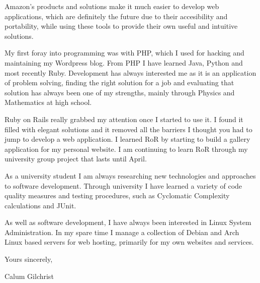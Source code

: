 


\setlength{\parskip}{0.5em}






Amazon's products and solutions make it much easier to develop web applications,
which are definitely the future due to their accesibility and portability, while
using these tools to provide their own useful and intuitive solutions. 


My first foray into programming was with PHP, which I used for hacking and
maintaining my Wordpress blog. From PHP I have learned Java, Python and most
recently Ruby. Development has always interested me as it is an application of
problem solving, finding the right solution for a job and evaluating that
solution has always been one of my strengths, mainly through Physics and
Mathematics at high school.

Ruby on Rails really grabbed my attention once I started to use it. I found it
filled with elegant solutions and it removed all the barriers I thought you had to
jump to develop a web application. I learned RoR by starting to build a gallery
application for my personal website. I am continuing to learn RoR through my
university group project that lasts until April.


As a university student I am always researching new technologies and approaches
to software development. Through university I have learned a variety of code
quality measures and testing procedures, such as Cyclomatic Complexity
calculations and JUnit.

As well as software development, I have always been interested in Linux System
Administration. In my spare time I manage a collection of Debian and Arch Linux
based servers for web hosting, primarily for my own websites and services.

\bigskip
Yours sincerely,


Calum Gilchrist
